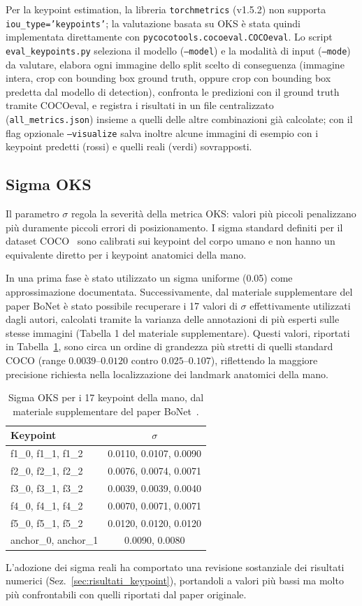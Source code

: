 Per la keypoint estimation, la libreria \texttt{torchmetrics} (v1.5.2)
non supporta \texttt{iou\_type='keypoints'}; la valutazione basata su
OKS è stata quindi implementata direttamente con
\texttt{pycocotools.cocoeval.COCOeval}. Lo script
\texttt{eval\_keypoints.py} seleziona il modello (\texttt{--model}) e
la modalità di input (\texttt{--mode}) da valutare, elabora ogni
immagine dello split scelto di conseguenza (immagine intera, crop con
bounding box ground truth, oppure crop con bounding box predetta dal
modello di detection), confronta le predizioni con il ground truth
tramite COCOeval, e registra i risultati in un file centralizzato
(\texttt{all\_metrics.json}) insieme a quelli delle altre combinazioni
già calcolate; con il flag opzionale \texttt{--visualize} salva inoltre
alcune immagini di esempio con i keypoint predetti (rossi) e quelli
reali (verdi) sovrapposti.

\subsection{Sigma OKS}
\label{sec:sigma_oks}

Il parametro $\sigma$ regola la severità della metrica OKS: valori più
piccoli penalizzano più duramente piccoli errori di posizionamento. I
sigma standard definiti per il dataset COCO~\cite{ronchi2017benchmarking} sono
calibrati sui keypoint del corpo umano e non hanno un equivalente diretto
per i keypoint anatomici della mano.

In una prima fase è stato utilizzato un sigma uniforme (0.05) come
approssimazione documentata. Successivamente, dal materiale
supplementare del paper BoNet è stato possibile recuperare i 17 valori
di $\sigma$ effettivamente utilizzati dagli autori, calcolati tramite la
varianza delle annotazioni di più esperti sulle stesse immagini (Tabella
1 del materiale supplementare). Questi valori, riportati in
Tabella~\ref{tab:sigma_oks}, sono circa un ordine di grandezza più
stretti di quelli standard COCO (range $0.0039$--$0.0120$ contro
$0.025$--$0.107$), riflettendo la maggiore precisione richiesta nella
localizzazione dei landmark anatomici della mano.

\begin{table}[H]
\centering
\caption{Sigma OKS per i 17 keypoint della mano, dal materiale supplementare del paper BoNet~\cite{escobar2019bonet}.}
\label{tab:sigma_oks}
\smallskip
\begin{tabular}{lc}
\toprule
Keypoint & $\sigma$ \\
\midrule
f1\_0, f1\_1, f1\_2 & 0.0110, 0.0107, 0.0090 \\
f2\_0, f2\_1, f2\_2 & 0.0076, 0.0074, 0.0071 \\
f3\_0, f3\_1, f3\_2 & 0.0039, 0.0039, 0.0040 \\
f4\_0, f4\_1, f4\_2 & 0.0070, 0.0071, 0.0071 \\
f5\_0, f5\_1, f5\_2 & 0.0120, 0.0120, 0.0120 \\
anchor\_0, anchor\_1 & 0.0090, 0.0080 \\
\bottomrule
\end{tabular}
\end{table}

L'adozione dei sigma reali ha comportato una revisione sostanziale dei
risultati numerici (Sez.~\ref{sec:risultati_keypoint}), portandoli a
valori più bassi ma molto più confrontabili con quelli riportati dal
paper originale.
